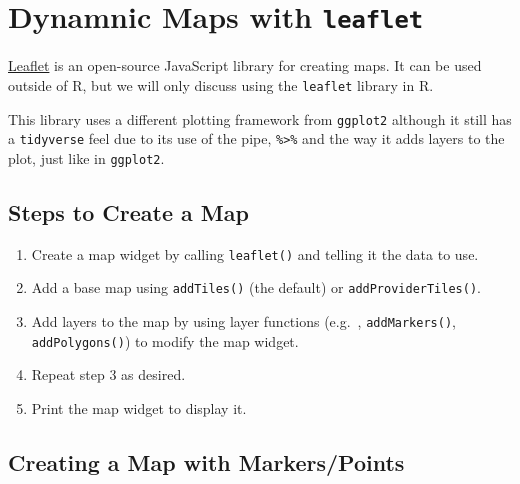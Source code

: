 \documentclass[
  letterpaper,
  DIV=11,
  numbers=noendperiod]{scrreprt}
\providecommand{\tightlist}{%
  \setlength{\itemsep}{0pt}\setlength{\parskip}{0pt}}\usepackage{longtable,booktabs,array}
\begin{document}
\section*{\texorpdfstring{Dynamnic Maps with
\texttt{leaflet}}{Dynamnic Maps with leaflet}}\label{dynamnic-maps-with-leaflet}


\href{https://leafletjs.com/}{Leaflet} is an open-source JavaScript
library for creating maps. It can be used outside of R, but we will only
discuss using the \texttt{leaflet} library in R.

This library uses a different plotting framework from \texttt{ggplot2}
although it still has a \texttt{tidyverse} feel due to its use of the
pipe, \texttt{\%\textgreater{}\%} and the way it adds layers to the
plot, just like in \texttt{ggplot2}.

\subsection*{Steps to Create a Map}\label{steps-to-create-a-map}

\begin{enumerate}
\def\labelenumi{\arabic{enumi}.}
\tightlist
\item
  Create a map widget by calling \texttt{leaflet()} and telling it the
  data to use.\\
\item
  Add a base map using \texttt{addTiles()} (the default) or
  \texttt{addProviderTiles()}.
\item
  Add layers to the map by using layer functions (e.g.~,
  \texttt{addMarkers()}, \texttt{addPolygons()}) to modify the map
  widget.\\
\item
  Repeat step 3 as desired.\\
\item
  Print the map widget to display it.
\end{enumerate}

\subsection*{Creating a Map with
Markers/Points}\label{creating-a-map-with-markerspoints}
\end{document}
